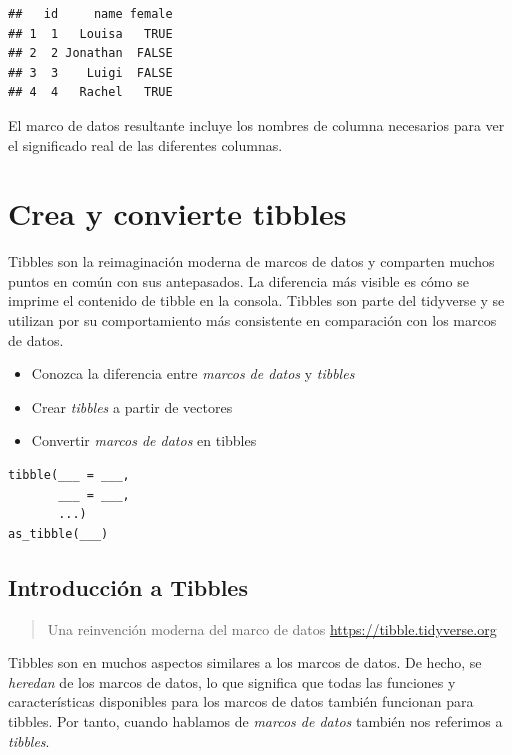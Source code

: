\documentclass[
]{book}
\providecommand{\tightlist}{%
  \setlength{\itemsep}{0pt}\setlength{\parskip}{0pt}}
\begin{document}
\begin{verbatim}
##   id     name female
## 1  1   Louisa   TRUE
## 2  2 Jonathan  FALSE
## 3  3    Luigi  FALSE
## 4  4   Rachel   TRUE
\end{verbatim}

El marco de datos resultante incluye los nombres de columna necesarios para ver el significado real de las diferentes columnas.

\hypertarget{crea-y-convierte-tibbles}{%
\section{Crea y convierte tibbles}\label{crea-y-convierte-tibbles}}

Tibbles son la reimaginación moderna de marcos de datos y comparten muchos puntos en común con sus antepasados. La diferencia más visible es cómo se imprime el contenido de tibble en la consola. Tibbles son parte del tidyverse y se utilizan por su comportamiento más consistente en comparación con los marcos de datos.

\begin{itemize}
\tightlist
\item
  Conozca la diferencia entre \emph{marcos de datos} y \emph{tibbles}
\item
  Crear \emph{tibbles} a partir de vectores
\item
  Convertir \emph{marcos de datos} en tibbles
\end{itemize}

\begin{verbatim}
tibble(___ = ___, 
       ___ = ___, 
       ...)
as_tibble(___)
\end{verbatim}

\hypertarget{introducciuxf3n-a-tibbles}{%
\subsection{Introducción a Tibbles}\label{introducciuxf3n-a-tibbles}}

\begin{quote}
Una reinvención moderna del marco de datos
\url{https://tibble.tidyverse.org}
\end{quote}

Tibbles son en muchos aspectos similares a los marcos de datos. De hecho, se \emph{heredan} de los marcos de datos, lo que significa que todas las funciones y características disponibles para los marcos de datos también funcionan para tibbles. Por tanto, cuando hablamos de \emph{marcos de datos} también nos referimos a \emph{tibbles}.
\end{document}
